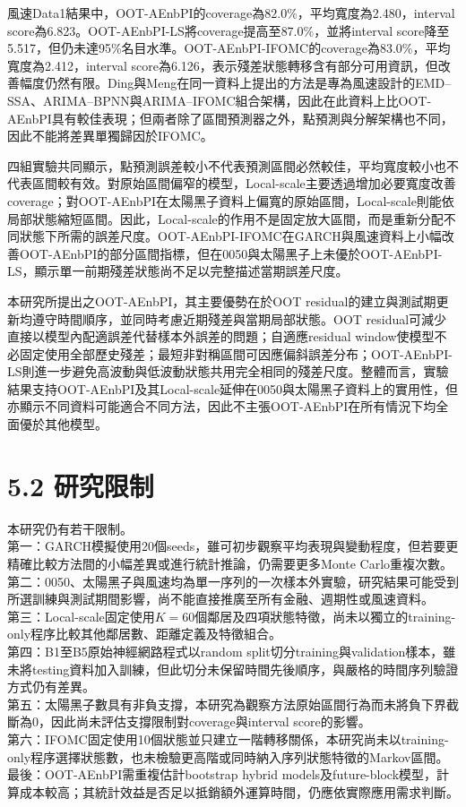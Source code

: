 風速Data1結果中，OOT-AEnbPI的coverage為$82.0\%$，平均寬度為2.480，interval score為6.823。OOT-AEnbPI-LS將coverage提高至$87.0\%$，並將interval score降至5.517，但仍未達95\%名目水準。OOT-AEnbPI-IFOMC的coverage為$83.0\%$，平均寬度為2.412，interval score為6.126，表示殘差狀態轉移含有部分可用資訊，但改善幅度仍然有限。Ding與Meng在同一資料上提出的方法是專為風速設計的EMD--SSA、ARIMA--BPNN與ARIMA--IFOMC組合架構，因此在此資料上比OOT-AEnbPI具有較佳表現；但兩者除了區間預測器之外，點預測與分解架構也不同，因此不能將差異單獨歸因於IFOMC。

四組實驗共同顯示，點預測誤差較小不代表預測區間必然較佳，平均寬度較小也不代表區間較有效。對原始區間偏窄的模型，Local-scale主要透過增加必要寬度改善coverage；對OOT-AEnbPI在太陽黑子資料上偏寬的原始區間，Local-scale則能依局部狀態縮短區間。因此，Local-scale的作用不是固定放大區間，而是重新分配不同狀態下所需的誤差尺度。OOT-AEnbPI-IFOMC在GARCH與風速資料上小幅改善OOT-AEnbPI的部分區間指標，但在0050與太陽黑子上未優於OOT-AEnbPI-LS，顯示單一前期殘差狀態尚不足以完整描述當期誤差尺度。

本研究所提出之OOT-AEnbPI，其主要優勢在於OOT residual的建立與測試期更新均遵守時間順序，並同時考慮近期殘差與當期局部狀態。OOT residual可減少直接以模型內配適誤差代替樣本外誤差的問題；自適應residual window使模型不必固定使用全部歷史殘差；最短非對稱區間可因應偏斜誤差分布；OOT-AEnbPI-LS則進一步避免高波動與低波動狀態共用完全相同的殘差尺度。整體而言，實驗結果支持OOT-AEnbPI及其Local-scale延伸在0050與太陽黑子資料上的實用性，但亦顯示不同資料可能適合不同方法，因此不主張OOT-AEnbPI在所有情況下均全面優於其他模型。

\section*{5.2 研究限制}

本研究仍有若干限制。\\
第一：GARCH模擬使用20個seeds，雖可初步觀察平均表現與變動程度，但若要更精確比較方法間的小幅差異或進行統計推論，仍需要更多Monte Carlo重複次數。\\
第二：0050、太陽黑子與風速均為單一序列的一次樣本外實驗，研究結果可能受到所選訓練與測試期間影響，尚不能直接推廣至所有金融、週期性或風速資料。\\
第三：Local-scale固定使用$K=60$個鄰居及四項狀態特徵，尚未以獨立的training-only程序比較其他鄰居數、距離定義及特徵組合。\\
第四：B1至B5原始神經網路程式以random split切分training與validation樣本，雖未將testing資料加入訓練，但此切分未保留時間先後順序，與嚴格的時間序列驗證方式仍有差異。\\
第五：太陽黑子數具有非負支撐，本研究為觀察方法原始區間行為而未將負下界截斷為0，因此尚未評估支撐限制對coverage與interval score的影響。\\
第六：IFOMC固定使用10個狀態並只建立一階轉移關係，本研究尚未以training-only程序選擇狀態數，也未檢驗更高階或同時納入序列狀態特徵的Markov區間。\\
最後：OOT-AEnbPI需重複估計bootstrap hybrid models及future-block模型，計算成本較高；其統計效益是否足以抵銷額外運算時間，仍應依實際應用需求判斷。

